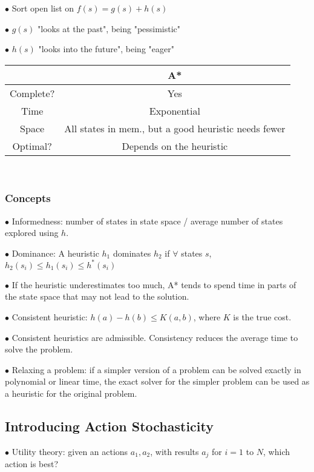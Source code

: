 \documentclass[english,openany]{book}
\begin{document}
    $\bullet$ Sort open list on $f(s) = g(s) + h(s)$
    
    $\bullet$ $g(s)$ "looks at the past", being "pessimistic"
    
    $\bullet$ $h(s)$ "looks into the future", being "eager"
    
    \begin{tabular}{|c|c|}
        \hline
        & A*  \\
        \hline
        Complete? & Yes \\
        Time & Exponential\\
        Space & All states in mem., but a good heuristic needs fewer\\
        Optimal? & Depends on the heuristic\\
        \hline
    \end{tabular}\\
    
    \subsubsection{Concepts}
    
    $\bullet$ Informedness: number of states in state space / average number of states explored using $h$.
    
    $\bullet$ Dominance: A heuristic $h_1$ dominates $h_2$ if $\forall$ states $s$, $h_2 (s_i) \leq h_1(s_i) \leq h^*(s_i)$
    
    $\bullet$ If the heuristic underestimates too much, A* tends to spend time in parts of the state space that may not lead to the solution.
    
    $\bullet$ Consistent heuristic: $h(a) - h(b) \leq K(a,b)$, where $K$ is the true cost.
    
    $\bullet$ Consistent heuristics are admissible. Consistency reduces the average time to solve the problem.
    
    $\bullet$ Relaxing a problem: if a simpler version of a problem can be solved exactly in polynomial or linear time, the exact solver for the simpler problem can be used as a heuristic for the original problem.
    
    \subsection{Introducing Action Stochasticity}
    
    $\bullet$ Utility theory: given an actions $a_1, a_2$, with results $a_j$ for $i = 1$ to $N$, which action is best?
    
\end{document}
